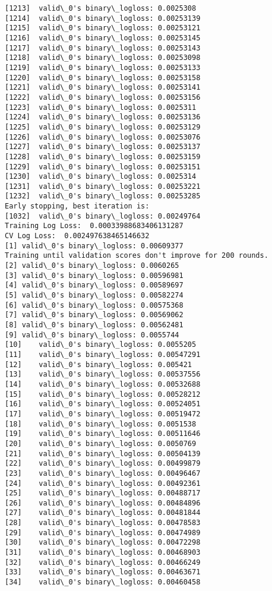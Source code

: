 \documentclass[11pt]{article}
\begin{document}
\begin{Verbatim}[commandchars=\\\{\}]
[1213]	valid\_0's binary\_logloss: 0.0025308
[1214]	valid\_0's binary\_logloss: 0.00253139
[1215]	valid\_0's binary\_logloss: 0.00253121
[1216]	valid\_0's binary\_logloss: 0.00253145
[1217]	valid\_0's binary\_logloss: 0.00253143
[1218]	valid\_0's binary\_logloss: 0.00253098
[1219]	valid\_0's binary\_logloss: 0.00253133
[1220]	valid\_0's binary\_logloss: 0.00253158
[1221]	valid\_0's binary\_logloss: 0.00253141
[1222]	valid\_0's binary\_logloss: 0.00253156
[1223]	valid\_0's binary\_logloss: 0.0025311
[1224]	valid\_0's binary\_logloss: 0.00253136
[1225]	valid\_0's binary\_logloss: 0.00253129
[1226]	valid\_0's binary\_logloss: 0.00253076
[1227]	valid\_0's binary\_logloss: 0.00253137
[1228]	valid\_0's binary\_logloss: 0.00253159
[1229]	valid\_0's binary\_logloss: 0.00253151
[1230]	valid\_0's binary\_logloss: 0.0025314
[1231]	valid\_0's binary\_logloss: 0.00253221
[1232]	valid\_0's binary\_logloss: 0.00253285
Early stopping, best iteration is:
[1032]	valid\_0's binary\_logloss: 0.00249764
Training Log Loss:  0.00033988683406131287
CV Log Loss:  0.002497638465146632
[1]	valid\_0's binary\_logloss: 0.00609377
Training until validation scores don't improve for 200 rounds.
[2]	valid\_0's binary\_logloss: 0.0060265
[3]	valid\_0's binary\_logloss: 0.00596981
[4]	valid\_0's binary\_logloss: 0.00589697
[5]	valid\_0's binary\_logloss: 0.00582274
[6]	valid\_0's binary\_logloss: 0.00575368
[7]	valid\_0's binary\_logloss: 0.00569062
[8]	valid\_0's binary\_logloss: 0.00562481
[9]	valid\_0's binary\_logloss: 0.0055744
[10]	valid\_0's binary\_logloss: 0.0055205
[11]	valid\_0's binary\_logloss: 0.00547291
[12]	valid\_0's binary\_logloss: 0.005421
[13]	valid\_0's binary\_logloss: 0.00537556
[14]	valid\_0's binary\_logloss: 0.00532688
[15]	valid\_0's binary\_logloss: 0.00528212
[16]	valid\_0's binary\_logloss: 0.00524051
[17]	valid\_0's binary\_logloss: 0.00519472
[18]	valid\_0's binary\_logloss: 0.0051538
[19]	valid\_0's binary\_logloss: 0.00511646
[20]	valid\_0's binary\_logloss: 0.0050769
[21]	valid\_0's binary\_logloss: 0.00504139
[22]	valid\_0's binary\_logloss: 0.00499879
[23]	valid\_0's binary\_logloss: 0.00496467
[24]	valid\_0's binary\_logloss: 0.00492361
[25]	valid\_0's binary\_logloss: 0.00488717
[26]	valid\_0's binary\_logloss: 0.00484896
[27]	valid\_0's binary\_logloss: 0.00481844
[28]	valid\_0's binary\_logloss: 0.00478583
[29]	valid\_0's binary\_logloss: 0.00474989
[30]	valid\_0's binary\_logloss: 0.00472298
[31]	valid\_0's binary\_logloss: 0.00468903
[32]	valid\_0's binary\_logloss: 0.00466249
[33]	valid\_0's binary\_logloss: 0.00463671
[34]	valid\_0's binary\_logloss: 0.00460458

\end{Verbatim}
\end{document}
